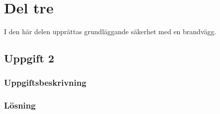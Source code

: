 %
%
%


\section{Del tre}
I den här delen upprättas grundläggande säkerhet med en brandvägg.


\subsection{Uppgift 2}
\subsubsection{Uppgiftsbeskrivning}


\subsubsection{Lösning}
